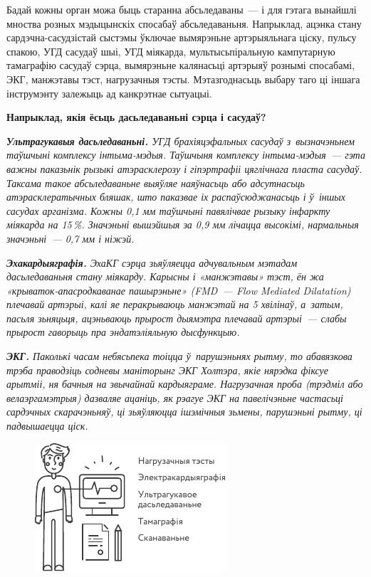 Бадай кожны орган можа быць старанна абсьледаваны~--- і для гэтага вынайшлі мноства розных мэдыцынскіх спосабаў абсьледаваньня. Напрыклад, ацэнка стану сардэчна-сасудзістай сыстэмы ўключае вымярэньне артэрыяльнага ціску, пульсу спакою, УГД сасудаў шыі, УГД міякарда, мультысьпіральную кампутарную тамаграфію сасудаў сэрца, вымярэньне калянасьці артэрыяў рознымі спосабамі, ЭКГ, манжэтавы тэст, нагрузачныя тэсты. Мэтазгоднасьць выбару таго ці іншага інструмэнту залежыць ад канкрэтнае сытуацыі.

\textbf{Напрыклад, якія ёсьць дасьледаваньні сэрца і сасудаў?}

\emph{\textbf{Ультрагукавыя дасьледаваньні.} УГД брахіяцэфальных сасудаў з~вызначэньнем таўшчыні комплексу інтыма-мэдыя. Таўшчыня комплексу інтыма-мэдыя~--- гэта важны паказьнік рызыкі атэрасклерозу і гіпэртрафіі цяглічнага пласта сасудаў. Таксама такое абсьледаваньне выяўляе наяўнасьць або адсутнасьць атэрасклератычных бляшак, што паказвае іх распаўсюджанасьць і ў~іншых сасудах арганізма. Кожны 0,1 мм таўшчыні павялічвае рызыку інфаркту міякарда на 15\,\%. Значэньні вышэйшыя за 0,9 мм лічацца высокімі, нармальныя значэньні~--- 0,7 мм і ніжэй.}

\emph{\textbf{Эхакардыяграфія.} ЭхаКГ сэрца зьяўляецца адчувальным мэтадам дасьледаваньня стану міякарду. Карысны і «манжэтавы» тэст, ён жа «крываток-апасродкаванае пашырэньне» (FMD~--- Flow Mediated Dilatation) плечавай артэрыі, калі яе перакрываюць манжэтай на 5 хвілінаў, а~затым, пасьля зьняцьця, ацэньваюць прырост дыямэтра плечавай артэрыі~--- слабы прырост гаворыць пра эндатэліяльную дысфункцыю.}

\emph{\textbf{ЭКГ.} Паколькі часам небясьпека тоіцца ў~парушэньнях рытму, то абавязкова трэба праводзіць содневы маніторынг ЭКГ Холтэра, якіе нярэдка фіксуе арытміі, ня бачныя на звычайнай кардыяграме. Нагрузачная проба (трэдміл або велаэргамэтрыя) дазваляе ацаніць, як рэагуе ЭКГ на павелічэньне частасьці сардэчных скарачэньняў, ці зьяўляюцца ішэмічныя зьмены, парушэньні рытму, ці падвышаецца ціск.}

\begin{figure}[htb!]
  \centering
  \includegraphics[scale=1.5]{willpower/ch3/6.pdf}
\end{figure}

